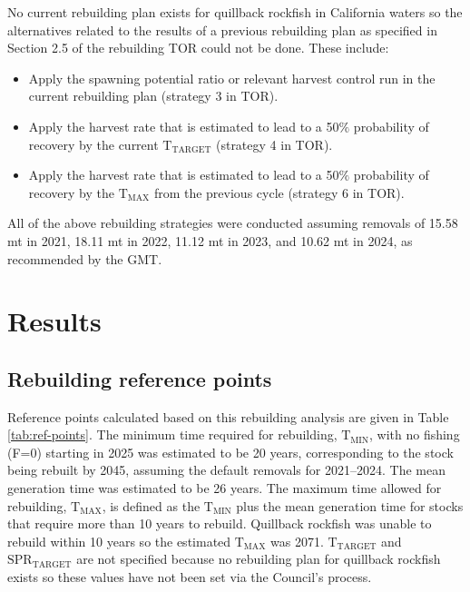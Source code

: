 \documentclass[11pt,
  letterpaper,
]{article}
\begin{document}
No current rebuilding plan exists for quillback rockfish in California waters so the alternatives related to the results of a previous rebuilding plan as specified in Section 2.5 of the rebuilding TOR could not be done. These include:

\begin{itemize}
 \item Apply the spawning potential ratio or relevant harvest control run in the current rebuilding plan (strategy 3 in TOR). 
 \item Apply the harvest rate that is estimated to lead to a 50$\%$ probability of recovery by the current $\text{T}_\text{TARGET}$ (strategy 4 in TOR).
 \item Apply the harvest rate that is estimated to lead to a 50$\%$ probability of recovery by the $\text{T}_\text{MAX}$ from the previous cycle (strategy 6 in TOR).
\end{itemize}

All of the above rebuilding strategies were conducted assuming removals of 15.58 mt in 2021, 18.11 mt in 2022, 11.12 mt in 2023, and 10.62 mt in 2024, as recommended by the GMT.

\hypertarget{results}{%
\section{Results}\label{results}}

\hypertarget{rebuilding-reference-points}{%
\subsection{Rebuilding reference points}\label{rebuilding-reference-points}}

Reference points calculated based on this rebuilding analysis are given in Table \ref{tab:ref-points}. The minimum time required for rebuilding, \(\text{T}_\text{MIN}\), with no fishing (F=0) starting in 2025 was estimated to be 20 years, corresponding to the stock being rebuilt by 2045, assuming the default removals for 2021--2024. The mean generation time was estimated to be 26 years. The maximum time allowed for rebuilding, \(\text{T}_\text{MAX}\), is defined as the \(\text{T}_\text{MIN}\) plus the mean generation time for stocks that require more than 10 years to rebuild. Quillback rockfish was unable to rebuild within 10 years so the estimated \(\text{T}_\text{MAX}\) was 2071. \(\text{T}_\text{TARGET}\) and \(\text{SPR}_\text{TARGET}\) are not specified because no rebuilding plan for quillback rockfish exists so these values have not been set via the Council's process.
\end{document}
